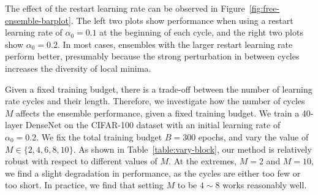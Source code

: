 

 The effect of the restart learning rate can be observed in Figure~\ref{fig:free-ensemble-barplot}.
The left two plots show performance when using a restart learning rate of $\alpha_0=0.1$ at the beginning of each cycle, and the right two plots show $\alpha_0=0.2$.
In most cases, ensembles with the larger restart learning rate perform better, presumably because the strong perturbation in between cycles increases the diversity of local minima.


 Given a fixed training budget, there is a trade-off between the number of learning rate cycles and their length. Therefore, we investigate how the number of cycles $M$ affects the ensemble performance, given a fixed training budget. We train a 40-layer DenseNet on the CIFAR-100 dataset with an initial learning rate of $\alpha_0=0.2$. We fix the total training budget $B=300$ epochs, and vary the value of $M\in\{2,4,6,8,10\}$. As shown in Table~\ref{table:vary-block}, our method is relatively robust with respect to different values of $M$. At the extremes, $M=2$ and $M=10$, we find a slight degradation in performance, as the cycles are either too few or too short. In practice, we find that setting $M$ to be $4\sim8$ works reasonably well.

